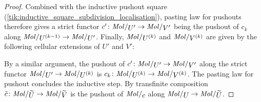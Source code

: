 \begin{proof}
    Combined with the inductive pushout square (\ref{tik:inductive_square_subdivision_localisation}), pasting law for pushouts therefore gives a strict functor \( c' \colon \molecin{U'} \to \molecin{V'} \) being the pushout of \( c_k \) along \( \molecin{\order{k - 1}{U}} \to \molecin{U'} \).
    Finally, \( \molecin{\order k U} \) and \(  {\molecin{\order k V}} \) are given by the following cellular extensions of \( U' \) and \( V' \):
    \begin{center}
    \end{center}
    By a similar argument, the pushout of \( c' \colon  \molecin{U'} \to \molecin{V'} \) along the strict functor \( \molecin{U'} \to \molecin{\order{k}{U}} \) is \( c_k \colon \molecin{\order{k}{U}} \to \molecin{\order{k}{V}} \).
    The pasting law for pushout concludes the inductive step.
    By transfinite composition \( \tilde{c} \colon \molecin{\selfloc{U}} \to \molecin{\selfloc{V}} \) is the pushout of \( \molecin{c} \) along \( \molecin{U} \to \molecin{\selfloc U} \).
\end{proof}

